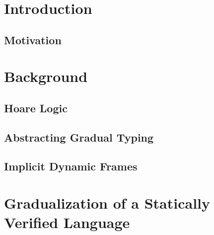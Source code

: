 
\chapter{Introduction}
\label{ch:introduction}


    \section{Motivation}
    \label{sec:motivationexamples}
    



\chapter{Background}
\label{sec:categorization-of-existing}


\section{Hoare Logic}
\label{sec:hoare-logic}


\section{Abstracting Gradual Typing}
\label{ssec:abstracting-gradual-typing}


\section{Implicit Dynamic Frames}
\label{ssec:implicit-dynamic-frames}





\chapter{Gradualization of a Statically Verified Language}
\label{ch:gradualization-of-a}


